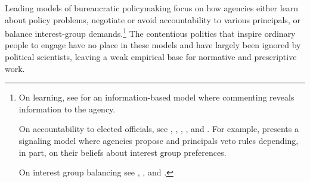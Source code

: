 Leading models of bureaucratic policymaking focus on how agencies either learn about policy problems, negotiate or avoid accountability to various principals, or balance interest-group demands.\footnote{
On learning, see \citet{Libgober2018} for an information-based model where commenting reveals information to the agency. 

On accountability to elected officials, see  \citet{Furlong1997}, \citet{Nou2016}, \citet{Potter2016}, \citet{Woods2018}, and \citet{Yackee2009RegGov}. For example, \citet{Potter2014dis} presents a signaling model where agencies propose and principals veto rules depending, in part, on their beliefs about interest group preferences. 

On interest group balancing see \citet{Yackee2006JOP},  \citet{Yackee2006JPART}, and \citet{Kerwin2011}.
} 
The contentious politics that inspire ordinary people to engage have no place in these models and have largely been ignored by political scientists, leaving a weak empirical base for normative and prescriptive work.


